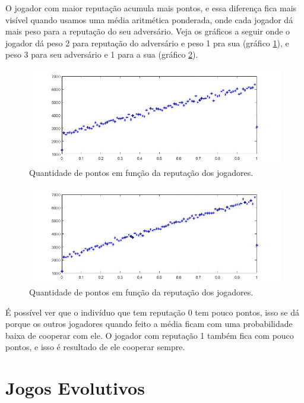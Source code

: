 O jogador com maior reputação acumula mais pontos, e essa diferença fica mais visível quando usamos uma média aritmética ponderada, onde cada jogador dá mais peso para a reputação do seu adversário. Veja os gráficos a seguir onde o jogador dá peso 2 para reputação do adversário e peso 1 pra sua (gráfico \ref{fig12}), e peso 3 para seu adversário e 1 para a sua (gráfico \ref{fig13}).

\begin{figure}[H]
\centering
\includegraphics[width=14cm]{graf12.jpg}
\caption{Quantidade de pontos em função da reputação dos jogadores.}
\label{fig12}
\end{figure}

\begin{figure}[H]
\centering
\includegraphics[width=14cm]{graf13.jpg}
\caption{Quantidade de pontos em função da reputação dos jogadores.}
\label{fig13}
\end{figure}

É possível ver que o indivíduo que tem reputação 0 tem pouco pontos, isso se dá porque os outros jogadores quando feito a média ficam com uma probabilidade baixa de cooperar com ele. O jogador com reputação 1 também fica com pouco pontos, e isso 
é resultado de ele cooperar sempre.

\section{Jogos Evolutivos}


